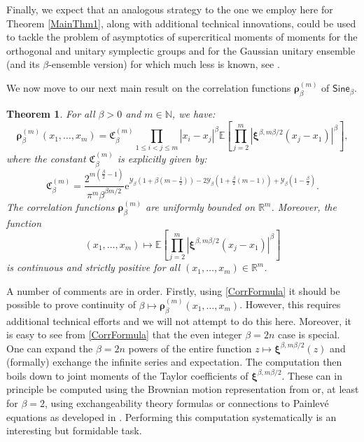 \documentclass[]{article}
\newtheorem{thm}{Theorem}[section]
\begin{document}
Finally, we expect that an analogous strategy to the one we employ here for Theorem \ref{MainThm1}, along with additional technical innovations, could be used to tackle the problem of asymptotics of supercritical moments of moments for the orthogonal and unitary symplectic groups and for the Gaussian unitary ensemble (and its $\beta$-ensemble version) for which much less is known, see \cite{FyodorovSimm,ClaeysGlesnerMinakovYang,ClaeysForkelKeating}.

We now move to our next main result on the correlation functions $\boldsymbol{\rho}^{(m)}_\beta$ of $\mathsf{Sine}_\beta$.


\begin{thm}\label{MainThm2} For all $\beta>0$ and $m\in \mathbb{N}$, we have:
\begin{equation}\label{CorrFormula}
\boldsymbol{\rho}^{(m)}_\beta(x_1,\dots,x_m)=\mathfrak{C}_{\beta}^{(m)} \prod_{1\le i<j \le m}\left|x_i-x_j\right|^\beta \mathbb{E}\left[\prod_{j=2}^m \left|\boldsymbol{\xi}^{\beta,m\beta/2}\left(x_j-x_1\right)\right|^\beta\right],
\end{equation}
where the constant $\mathfrak{C}_{\beta}^{(m)}$ is explicitly given by:
\begin{equation}
\mathfrak{C}_{\beta}^{(m)}=\frac{2^{m\left(\frac{\beta}{2}-1\right)}}{\pi^m \beta^{\beta m/2}}\mathrm{e}^{\mathcal{Y}_\beta\left(1+\beta(m-\frac{1}{2})\right)-2\mathcal{Y}_\beta\left(1+\frac{\beta}{2}(m-1)\right)+\mathcal{Y}_\beta\left(1-\frac{\beta}{2}\right)}.
\end{equation}
The correlation functions $\boldsymbol{\rho}^{(m)}_\beta$ are uniformly bounded on $\mathbb{R}^m$. Moreover, the function 
\begin{equation}\label{CorrFnFn}
(x_1,\dots,x_m)\mapsto \mathbb{E}\left[\prod_{j=2}^m \left|\boldsymbol{\xi}^{\beta,m\beta/2}\left(x_j-x_1\right)\right|^\beta\right]
\end{equation}
is continuous and strictly positive for all $(x_1,\dots,x_m)\in \mathbb{R}^m$.
\end{thm}

A number of comments are in order. Firstly, using \eqref{CorrFormula} it should be possible to prove  continuity of $\beta\mapsto \boldsymbol{\rho}_\beta^{(m)}(x_1,\dots,x_m)$. However, this requires additional technical efforts and we will not attempt to do this here. Moreover, it is easy to see from \eqref{CorrFormula} that the even integer $\beta=2n$ case is special. One can expand the $\beta=2n$ powers of the entire function $z\mapsto\boldsymbol{\xi}^{\beta,m \beta/2}(z)$ and (formally) exchange the infinite series and expectation. The computation then boils down to joint moments of the Taylor coefficients of $\boldsymbol{\xi}^{\beta,m \beta/2}$. These can in principle be computed using the Brownian motion representation from \cite{LiValko} or, at least for $\beta=2$, using exchangeability theory formulas or connections to Painlev\'{e} equations as developed in \cite{AGKW}. Performing this computation systematically is an interesting but formidable task. 
\end{document}

